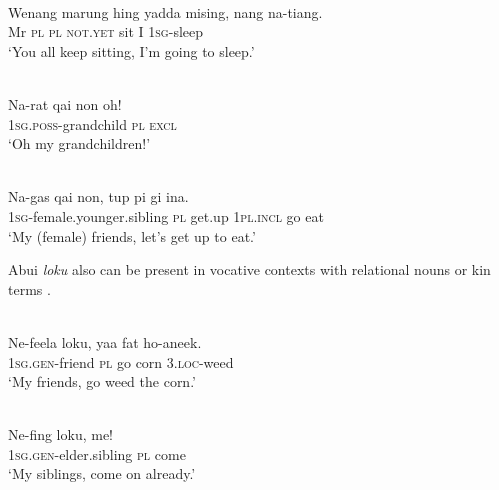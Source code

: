 \ea%
\label{ex:9:88}
 \\
\gll  Wenang  marung hing yadda mising, nang {na-ti}{{\textglotstop}}{ang.} \\
   Mr  \textsc{pl} \textsc{pl} \textsc{not.yet} sit I \textsc{1sg}-sleep  \\
\glt `You all keep sitting, I'm going to sleep.'
\z







\ea%
\label{ex:9:89}
 \\
\gll Na-{rat qai} non oh!  \\
  1\textsc{sg}.\textsc{poss}-grandchild \textsc{pl} \textsc{excl}   \\
\glt `Oh my grandchildren!'
\z







\ea%
\label{ex:9:90}
 \\
\gll  Na-{gas qai} non, tup pi gi ina. \\
   \textsc{1sg-}female.younger.sibling \textsc{pl} get.up \textsc{1pl.incl} go eat  \\
\glt `My (female) friends, let's get up to eat.'
\z






Abui \textit{loku} also can be present in vocative contexts with relational nouns  or kin terms .


\ea%
\label{ex:9:91}
 \\
\gll  Ne-feela loku, yaa fat ho-aneek.\\
   \textsc{1sg.gen-}friend \textsc{pl} go corn \textsc{3.loc}-weed \\
\glt `My friends, go weed the corn.'
\z







\ea%
\label{ex:9:92}
 \\
\gll  Ne-fing loku, me! \\
    \textsc{1sg.gen-}elder.sibling \textsc{pl} come \\
\glt `My siblings, come on already.'
\z







